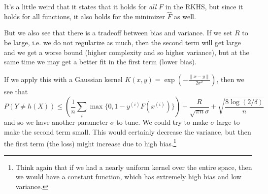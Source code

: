   It's a little weird that it states that it holds for \textit{all} $F$ in the RKHS, but since it holds for all functions, it also holds for the minimizer $\hat{F}$ as well. 

  But we also see that there is a tradeoff between bias and variance. If we set $R$ to be large, i.e. we do not regularize as much, then the second term will get large and we get a worse bound (higher complexity and so higher variance), but at the same time we may get a better fit in the first term (lower bias). 

  If we apply this with a Gaussian kernel $K(x, y) = \exp(-\frac{\|x - y\|}{2 \sigma^2})$, then we see that 
  \begin{equation}
    P(Y \neq h(X)) \leq \left( \frac{1}{n} \sum_{i} \max\{0, 1 - y^{(i)} F(x^{(i)})\} \right) + \frac{R}{ \sqrt{\pi n} \sigma} + \sqrt{\frac{8 \log(2/\delta)}{n}}
  \end{equation}
  and so we have another parameter $\sigma$ to tune. We could try to make $\sigma$ large to make the second term small. This would certainly decrease the variance, but then the first term (the loss) might increase due to high bias.\footnote{Think again that if we had a nearly uniform kernel over the entire space, then we would have a constant function, which has extremely high bias and low variance.}

